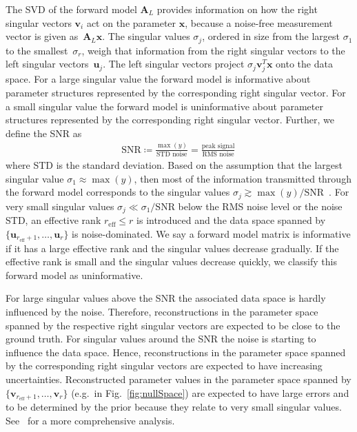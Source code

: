 The SVD of the forward model $\bm{A}_L$ provides information on how the right singular vectors $\bm{v}_i$ act on the parameter $\bm{x}$, because a noise-free measurement vector is given as~$\bm{A}_L\bm{x}$.
The singular values $\sigma_j $, ordered in size from the largest $\sigma_1$ to the smallest~$\sigma_{r}$, weigh that information from the right singular vectors to the left singular vectors~$\bm{u}_j$.
The left singular vectors project $\sigma_j \bm{v}^T_j \bm{x} $ onto the data space.
For a large singular value the forward model is informative about parameter structures represented by the corresponding right singular vector. 
For a small singular value the forward model is uninformative about parameter structures represented by the corresponding right singular vector.
Further, we define the SNR as
\begin{align}
	\text{SNR} \coloneqq \frac{\max(y)}{\text{STD noise}} = \frac{\text{peak signal}}{\text{RMS noise}} \label{eq:SNR} \, 
\end{align}
where STD is the standard deviation.
Based on the assumption that the largest singular value $\sigma_1  \approx \max(y)$, then most of the information transmitted through the forward model corresponds to the singular values $\sigma_j \gtrsim \max(y)/ \text{SNR}$~\cite{fox2025BlokkLecNot}.
For very small singular values $\sigma_j \ll \sigma_1/\text{SNR}$ below the RMS noise level or the noise STD, an effective rank $r_{\text{eff}} \leq r$ is introduced and the data space spanned by $ \{\bm{u}_{r_{\text{eff}} +1}, \dots ,\bm{u}_r \}$ is noise-dominated.
We say a forward model matrix is informative if it has a large effective rank and the singular values decrease gradually.
If the effective rank is small and the singular values decrease quickly, we classify this forward model as uninformative.

For large singular values above the SNR the associated data space is hardly influenced by the noise.
Therefore, reconstructions in the parameter space spanned by the respective right singular vectors are expected to be close to the ground truth.
For singular values around the SNR the noise is starting to influence the data space.
Hence, reconstructions in the parameter space spanned by the corresponding right singular vectors are expected to have increasing uncertainties.
Reconstructed parameter values in the parameter space spanned by $ \{\bm{v}_{r_{\text{eff}} +1}, \dots ,\bm{v}_r \}$ (e.g.~in Fig.~\ref{fig:nullSpace}) are expected to have large errors and to be determined by the prior because they relate to very small singular values.
See~\cite{tan2016LecNot} for a more comprehensive analysis.

